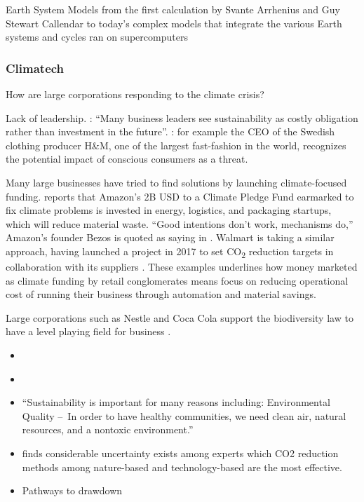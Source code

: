 \documentclass[
  letterpaper,
  DIV=11,
  numbers=noendperiod]{scrartcl}
\begin{document}
Earth System Models from the first calculation by Svante Arrhenius and
Guy Stewart Callendar to today's complex models that integrate the
various Earth systems and cycles ran on supercomputers
\citet{andersonCO2GreenhouseEffect2016}

\subsubsection{Climatech}\label{climatech}

How are large corporations responding to the climate crisis?

Lack of leadership. \citet{capgeminiWorldBalanceWhy2022}: ``Many
business leaders see sustainability as costly obligation rather than
investment in the future''. \citet{hoikkalaCEOSeesTerrible2019}: for
example the CEO of the Swedish clothing producer H\&M, one of the
largest fast-fashion in the world, recognizes the potential impact of
conscious consumers as a threat.

Many large businesses have tried to find solutions by launching
climate-focused funding. \citep{korosecAmazonTaps2B2021} reports that
Amazon's 2B USD to a Climate Pledge Fund earmarked to fix climate
problems is invested in energy, logistics, and packaging startups, which
will reduce material waste. ``Good intentions don't work, mechanisms
do,'' Amazon's founder Bezos is quoted as saying in
\citep{cliffordHowThisPopular2022}. Walmart is taking a similar
approach, having launched a project in 2017 to set CO\textsubscript{2}
reduction targets in collaboration with its suppliers
\citet{walmartProjectGigaton2023}. These examples underlines how money
marketed as climate funding by retail conglomerates means focus on
reducing operational cost of running their business through automation
and material savings.

Large corporations such as Nestle and Coca Cola support the biodiversity
law to have a level playing field for business
\citep{greensefaNatureVoteSuccess2023}.

\begin{itemize}
\item
  \citet{PublicHealthLinkages2013}
\item
  \citet{guidottiHealthSustainabilityIntroduction2015}
\item
  ``Sustainability is important for many reasons including:
  Environmental Quality --~In order to have healthy communities, we need
  clean air, natural resources, and a nontoxic environment.''
\item
  \citet{lowRethinkingNetZeroSystems2022} finds considerable uncertainty
  exists among experts which CO2 reduction methods among nature-based
  and technology-based are the most effective.
\item
  Pathways to drawdown
\end{itemize}
\end{document}
